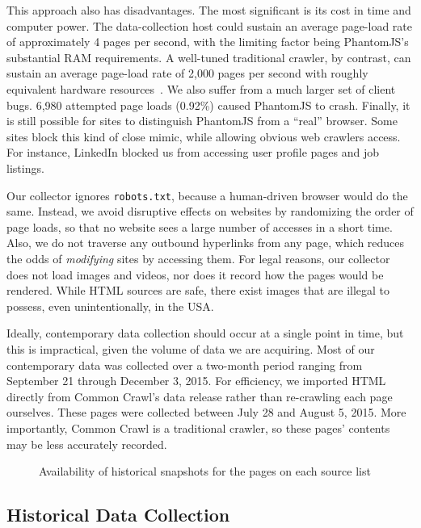 This approach also has disadvantages.  The most significant is its
cost in time and computer power.  The data-collection host could
sustain an average page-load rate of approximately 4 pages per second,
with the limiting factor being PhantomJS's substantial RAM
requirements.  A well-tuned traditional crawler, by contrast, can
sustain an average page-load rate of 2,000 pages per second with
roughly equivalent hardware resources~\cite{ahmed2015around}. We also
suffer from a much larger set of client bugs.  6,980 attempted page
loads (0.92\%) caused PhantomJS to crash.  Finally, it is still
possible for sites to distinguish PhantomJS from a “real” browser.
Some sites block this kind of close mimic, while allowing obvious web
crawlers access.  For instance, LinkedIn blocked us from accessing
user profile pages and job listings.

Our collector ignores \texttt{robots.txt}, because a human-driven
browser would do the same.  Instead, we avoid disruptive effects on
websites by randomizing the order of page loads, so that no website
sees a large number of accesses in a short time.  Also, we do not
traverse any outbound hyperlinks from any page, which reduces the odds
of \emph{modifying} sites by accessing them.  For legal reasons, our
collector does not load images and videos, nor does it record how the
pages would be rendered. While HTML sources are safe, there exist images
that are illegal to possess, even unintentionally, in the USA.

Ideally, contemporary data collection should occur at a single point
in time, but this is impractical, given the volume of data we are
acquiring.  Most of our contemporary data was collected over a
two-month period ranging from September 21 through December 3, 2015.
For efficiency, we imported HTML directly from Common Crawl's data
release rather than re-crawling each page ourselves.  These pages were
collected between July 28 and August 5, 2015.  More importantly,
Common Crawl is a traditional crawler, so these pages' contents may be
less accurately recorded.

\begin{figure*}
\centering\sffamily\relax
\caption{Availability of historical snapshots for the pages on each
  source list}
\label{t:list-historical-snaps}
\end{figure*}

\subsection{Historical Data Collection}
\label{s:collection_historical}

